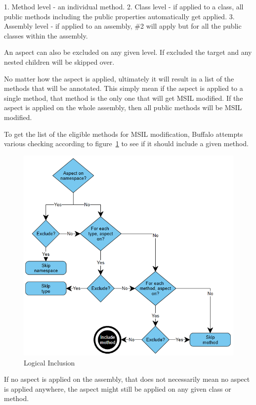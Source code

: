 1. Method level - an individual method.
2. Class level - if applied to a class, all public methods including the public properties automatically get applied.
3. Assembly level - if applied to an assembly, \#2 will apply but for all the public classes within the assembly.

An aspect can also be excluded on any given level. If excluded the target and any nested children will be skipped over. 

No matter how the aspect is applied, ultimately it will result in a list of the methods that will be annotated. This simply mean if the aspect is applied to a single method, that method is the only one that will get MSIL modified. If the aspect is applied on the whole assembly, then all public methods will be MSIL modified.

To get the list of the eligible methods for MSIL modification, Buffalo attempts various checking according to figure~\ref{logical_inclusion} to see if it should include a given method.

\begin{figure}[H]
  \includegraphics[scale=1.0]{AspectLogicalInclusion.PNG}
  \centering
  \caption{Logical Inclusion\label{logical_inclusion}}
\end{figure}

If no aspect is applied on the assembly, that does not necessarily mean no aspect is applied anywhere, the aspect might still be applied on any given class or method.

